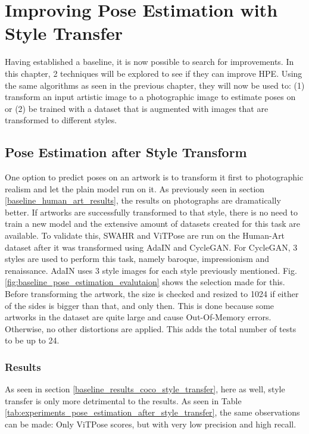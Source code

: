\chapter{Improving Pose Estimation with Style Transfer}
\label{chap:improvements}
Having established a baseline, it is now possible to search for improvements.
In this chapter, 2 techniques will be explored to see if they can improve \gls{HPE}.
Using the same algorithms as seen in the previous chapter, they will now be used to:
(1) transform an input artistic image to a photographic image to estimate poses on or
(2) be trained with a dataset that is augmented with images that are transformed to different styles.

\section{Pose Estimation after Style Transform}
\label{chap:improvements_style_transfer}
One option to predict poses on an artwork is to transform it first to photographic realism and let the plain model run on it.
As previously seen in section \ref{baseline_human_art_results}, the results on photographs are dramatically better.
If artworks are successfully transformed to that style, there is no need to train a new model and the extensive amount of datasets created for this task are available.
To validate this, SWAHR and ViTPose are run on the Human-Art dataset after it was transformed using AdaIN and CycleGAN.
For CycleGAN, 3 styles are used to perform this task, namely baroque, impressionism and renaissance.
AdaIN uses 3 style images for each style previously mentioned.
Fig. \ref{fig:baseline_pose_estimation_evalutaion} shows the selection made for this.
Before transforming the artwork, the size is checked and resized to 1024 if either of the sides is bigger than that, and only then.
This is done because some artworks in the dataset are quite large and cause Out-Of-Memory errors.
Otherwise, no other distortions are applied.
This adds the total number of tests to be up to 24.

\subsection{Results}
\label{chap:improvements_results_style_transfer}
As seen in section \ref{baseline_results_coco_style_transfer}, here as well, style transfer is only more detrimental to the results.
As seen in Table \ref{tab:experiments_pose_estimation_after_style_transfer}, the same observations can be made: Only ViTPose scores, but with very low precision and high recall.

